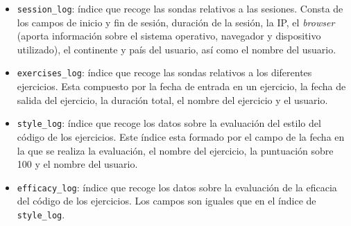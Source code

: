 \begin{itemize}
\item \texttt{session\_log}: índice que recoge las sondas relativos a las sesiones. Consta de los campos de inicio y fin de sesión, duración de la sesión, la IP, el \textit{browser} (aporta información sobre el sistema operativo, navegador y dispositivo utilizado), el continente y país del usuario, así como el nombre del usuario.
\item \texttt{exercises\_log}: índice que recoge las sondas relativos a los diferentes ejercicios. Esta compuesto por la fecha de entrada en un ejercicio, la fecha de salida del ejercicio, la duración total, el nombre del ejercicio y el usuario.
\item \texttt{style\_log}: índice que recoge los datos sobre la evaluación del estilo del código de los ejercicios. Este índice esta formado por el campo de la fecha en la que se realiza la evaluación, el nombre del ejercicio, la puntuación sobre 100 y el nombre del usuario.
\item \texttt{efficacy\_log}: índice que recoge los datos sobre la evaluación de la eficacia del código de los ejercicios. Los campos son iguales que en el índice de \texttt{style\_log}.
\end{itemize}


